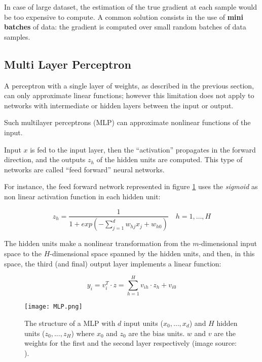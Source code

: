 In case of large dataset, the estimation of the true gradient at each sample would be too expensive to compute. A common solution consists in the use of \textbf{mini batches} of data: the gradient is computed over small random batches of data samples.

\subsection{Multi Layer Perceptron}

A perceptron with a single layer of weights, as described in the previous section, can only approximate linear functions; however this limitation does not apply to networks with intermediate or hidden layers between the input or output.
 
Such multilayer perceptrons (MLP) can approximate nonlinear functions of the input.

Input $x$ is fed to the input layer, then the ``activation'' propagates in the forward direction, and the outputs $z_h$ of the hidden units are computed. This type of networks are called ``feed forward'' neural networks.

For instance, the feed forward network represented in figure \ref{fig:ffnn} uses the \textit{sigmoid} as non linear activation function in each hidden unit:

\begin{equation}
    \tag{Sigmoid function}
    z_h = \frac{1}{1 + exp(- \sum_{j=1}^d w_{hj} x_j + w_{h0})} \quad h = 1, \dots, H
\end{equation}

The hidden units make a nonlinear transformation from the $m$-dimensional input space to the $H$-dimensional space spanned by the hidden units, and then, in this space, the third (and final) output layer implements a linear function:

\begin{equation}
    y_i = v_i^T \cdot z = \sum_{h = 1}^H v_{ih} \cdot z_h + v_{i0}
\end{equation}

\begin{figure}[H]
  \centering
  \texttt{[image: MLP.png]}
  \caption{The structure of a MLP with $d$ input units ($x_0, \dots, x_d$) and $H$ hidden units ($z_0, \dots, z_H$) where $x_0$ and $z_0$ are the bias units. $w$ and $v$ are the weights for the first and the second layer respectively (image source: \cite{ml}).}
  \label{fig:ffnn}
\end{figure}

